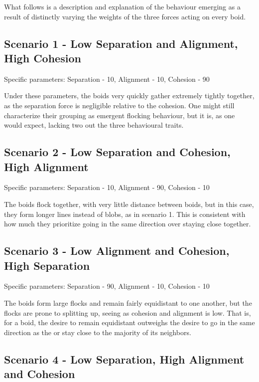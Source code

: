 \documentclass[twoside]{article}
\begin{document}
\begin{multicols}{2}
    What follows is a description and explanation of the behaviour emerging as a result of distinctly varying the weights of the three forces acting on every boid.

    \subsection{Scenario 1 - Low Separation and Alignment, High Cohesion}

    Specific parameters: Separation - 10, Alignment - 10, Cohesion - 90

    Under these parameters, the boids very quickly gather extremely tightly together, as the separation force is negligible relative to the cohesion. 
    One might still characterize their grouping as emergent flocking behaviour, but it is, as one would expect, lacking two out the three behavioural traits.

    \subsection{Scenario 2 - Low Separation and Cohesion, High Alignment}

    Specific parameters: Separation - 10, Alignment - 90, Cohesion - 10

    The boids flock together, with very little distance between boids, but in this case, they form longer lines instead of blobs, as in scenario 1. 
    This is consistent with how much they prioritize going in the same direction over staying close together.

    \subsection{Scenario 3 - Low Alignment and Cohesion, High Separation}

    Specific parameters: Separation - 90, Alignment - 10, Cohesion - 10
    
    The boids form large flocks and remain fairly equidistant to one another, but the flocks are prone to splitting up, seeing as cohesion and alignment is low. 
    That is, for a boid, the desire to remain equidistant outweighs the desire to go in the same direction as the or stay close to the majority of its neighbors.

    \subsection{Scenario 4 - Low Separation, High Alignment and Cohesion}


\end{multicols}
\end{document}
